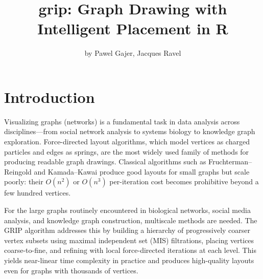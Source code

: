 \title{grip: Graph Drawing with Intelligent Placement in R}


\author{by Pawel Gajer, Jacques Ravel}

\maketitle


\section{Introduction}\label{introduction}

Visualizing graphs (networks) is a fundamental task in data analysis across
disciplines---from social network analysis to systems biology to knowledge graph
exploration. Force-directed layout algorithms, which model vertices as charged
particles and edges as springs, are the most widely used family of methods for
producing readable graph drawings. Classical algorithms such as
Fruchterman--Reingold \citep{fruchterman1991} and Kamada--Kawai \citep{kamada1989} produce
good layouts for small graphs but scale poorly: their \(O(n^2)\) or \(O(n^3)\)
per-iteration cost becomes prohibitive beyond a few hundred vertices.

For the large graphs routinely encountered in biological networks, social media
analysis, and knowledge graph construction, multiscale methods are needed. The
GRIP algorithm \citep{gajer2002, gajer2004} addresses this by building a hierarchy
of progressively coarser vertex subsets using maximal independent set (MIS)
filtrations, placing vertices coarse-to-fine, and refining with local
force-directed iterations at each level. This yields near-linear time complexity
in practice and produces high-quality layouts even for graphs with thousands of
vertices.

